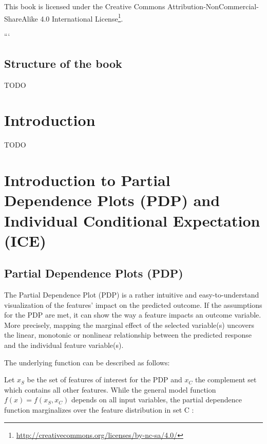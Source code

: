 \documentclass[
]{krantz}
\renewcommand{\href}[2]{#2\footnote{\url{#1}}}
\begin{document}
This book is licensed under the \href{http://creativecommons.org/licenses/by-nc-sa/4.0/}{Creative Commons Attribution-NonCommercial-ShareAlike 4.0 International License}.

```

\hypertarget{structure-of-the-book}{%
\section*{Structure of the book}\label{structure-of-the-book}}


TODO

\mainmatter

\hypertarget{introduction}{%
\chapter{Introduction}\label{introduction}}

TODO

\hypertarget{introduction-to-partial-dependence-plots-pdp-and-individual-conditional-expectation-ice}{%
\chapter{Introduction to Partial Dependence Plots (PDP) and Individual Conditional Expectation (ICE)}\label{introduction-to-partial-dependence-plots-pdp-and-individual-conditional-expectation-ice}}

\hypertarget{partial-dependence-plots-pdp}{%
\section{Partial Dependence Plots (PDP)}\label{partial-dependence-plots-pdp}}

The Partial Dependence Plot (PDP) is a rather intuitive and easy-to-understand visualization of the features' impact on the predicted outcome. If the assumptions for the PDP are met, it can show the way a feature impacts an outcome variable. More precisely, mapping the marginal effect of the selected variable(s) uncovers the linear, monotonic or nonlinear relationship between the predicted response and the individual feature variable(s).\citep{molnar2019}

The underlying function can be described as follows:

Let \(x_S\) be the set of features of interest for the PDP and \(x_C\) the complement set which contains all other features.
While the general model function \(f(x) = f(x_S, x_C)\) depends on all input variables, the partial dependence function marginalizes over the feature distribution in set C \citep{hastie2013elements}:
\end{document}
